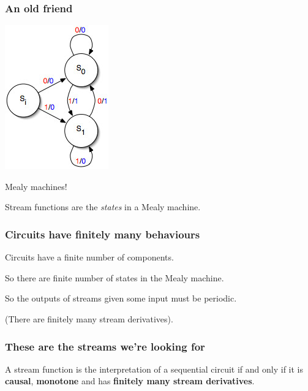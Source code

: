 \begin{frame}
    \frametitle{An old friend}

    \Large

    \begin{center}
        \includegraphics[scale=0.5]{imgs/mealy-machine}

        Mealy machines!

        \pause

        \normalsize
        Stream functions are the \emph{states} in a Mealy machine.
    \end{center}

\end{frame}
\begin{frame}
    \frametitle{Circuits have finitely many behaviours}

    Circuits have a finite number of components.

    \pause

    So there are finite number of states in the Mealy machine.

    \pause

    So the outputs of streams given some input must be \alert{periodic}.

    \pause

    (There are finitely many \alert{stream derivatives}).
\end{frame}
\begin{frame}
    \frametitle{These are the streams we're looking for}

    \begin{theorem}
        A stream function is the interpretation of a sequential circuit
        if and only if it is \textbf{causal}, \textbf{monotone} and has
        \textbf{finitely many stream derivatives}.
    \end{theorem}
\end{frame}
